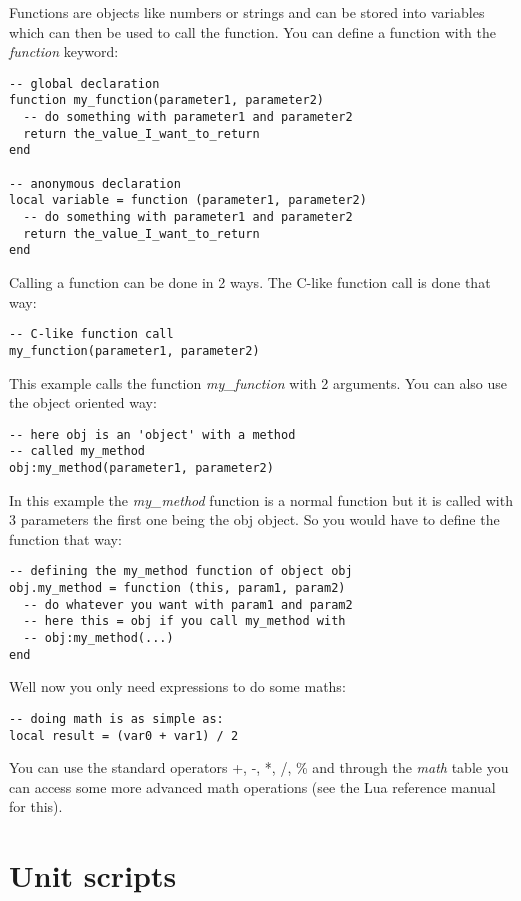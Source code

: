 \documentclass[a4paper,10pt]{article}
\begin{document}
Functions are objects like numbers or strings and can be stored into variables which can then be used to call the function. You can define a function with the \emph{function} keyword:

\begin{lstlisting}
-- global declaration
function my_function(parameter1, parameter2)
  -- do something with parameter1 and parameter2
  return the_value_I_want_to_return
end

-- anonymous declaration
local variable = function (parameter1, parameter2)
  -- do something with parameter1 and parameter2
  return the_value_I_want_to_return
end
\end{lstlisting}

Calling a function can be done in 2 ways. The C-like function call is done that way:
\begin{lstlisting}
-- C-like function call
my_function(parameter1, parameter2)
\end{lstlisting}

This example calls the function \emph{my\_function} with 2 arguments. You can also use the object oriented way:
\begin{lstlisting}
-- here obj is an 'object' with a method
-- called my_method
obj:my_method(parameter1, parameter2)
\end{lstlisting}

In this example the \emph{my\_method} function is a normal function but it is called with 3 parameters the first one being the obj object. So you would have to define the function that way:
\begin{lstlisting}
-- defining the my_method function of object obj
obj.my_method = function (this, param1, param2)
  -- do whatever you want with param1 and param2
  -- here this = obj if you call my_method with
  -- obj:my_method(...)
end
\end{lstlisting}

Well now you only need expressions to do some maths:
\begin{lstlisting}
-- doing math is as simple as:
local result = (var0 + var1) / 2
\end{lstlisting}

You can use the standard operators +, -, *, /, \% and through the \emph{math} table you can access some more advanced math operations (see the Lua reference manual for this).

\section{Unit scripts}
\end{document}
